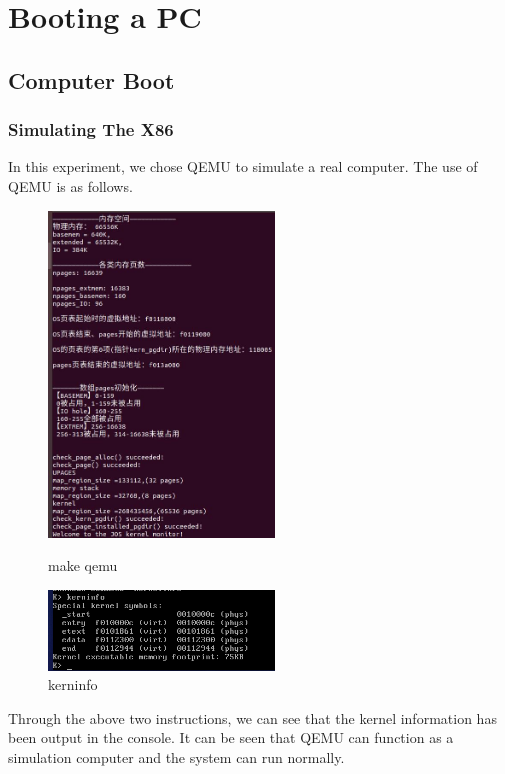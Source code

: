 
\section{Booting a PC}

\subsection{Computer Boot }


\subsubsection{Simulating The X86}
In this experiment, we chose QEMU to simulate a real computer. The use of QEMU is as follows.
\begin{figure}[htbp]
\centering
\begin{minipage}[t]{0.48\textwidth}
\centering
\includegraphics[width=6cm]{figure/make_qemu}
\caption{make qemu}
\end{minipage}
\begin{minipage}[t]{0.48\textwidth}
\centering
\includegraphics[width=6cm]{figure/kerninfo}
\caption{kerninfo}
\end{minipage}
\end{figure}

Through the above two instructions, we can see that the kernel information has been output in the console. It can be seen that QEMU can function as a simulation computer and the system can run normally.

